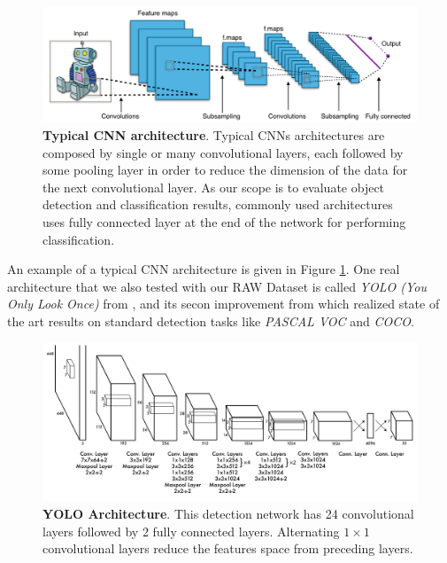 \begin{figure}
    \centering
    \includegraphics[width=\textwidth]{figures/1_perception_and_sensing_in_robotics/typical_cnn}
    \caption{\textbf{Typical CNN architecture}. Typical CNNs architectures are composed by single or many convolutional layers, each followed by some pooling layer in order to reduce the dimension of the data for the next convolutional layer. As our scope is to evaluate object detection and classification results, commonly used architectures uses fully connected layer at the end of the network for performing classification.} 
    \label{fig:typical_cnn}
\end{figure}

An example of a typical CNN architecture is given in Figure \ref{fig:typical_cnn}. One real architecture that we also tested with our RAW Dataset is called \emph{YOLO (You Only Look Once)} from \cite{Redmon2016YOLO}, and its secon improvement from \cite{Redmon2017YOLO2} which realized state of the art results on standard detection tasks like \emph{PASCAL VOC} and \emph{COCO}.

\begin{figure}
    \centering
    \includegraphics[width=\textwidth]{figures/1_perception_and_sensing_in_robotics/yolo_architecture}
    \caption{\textbf{YOLO Architecture}. This detection network has 24 convolutional layers followed by 2 fully connected layers. Alternating $1 \times 1$ convolutional layers reduce the features space from preceding layers.} 
    \label{fig:yolo_architecture}
\end{figure}

